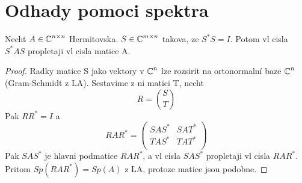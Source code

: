 \section{\texorpdfstring{Odhady pomoci spektra}{Odhady pomoci spektra}}
\vspace{5mm}
\large

\begin{theorem}[Propletani A]\label{sp_cross_a}
	Necht $A \in \operatorname{\mathbb{C}}^{n \times n}$ Hermitovska. $S \in \operatorname{\mathbb{C}}^{m \times n}$ takova, ze $S^{\ast}S = I$.
	Potom vl cisla $S^{\ast}AS$ propletaji vl cisla matice A.
\end{theorem}
\begin{proof}
	Radky matice S jako vektory v $\operatorname{\mathbb{C}}^n$ lze rozsirit na ortonormalní baze $\operatorname{\mathbb{C}}^n$ (Gram-Schmidt z LA). Sestavime z ni matici T, necht
	\[ R = \binom{S}{T} \]
	Pak $RR^{\ast} = I$ a
\[
	RAR^{\ast} =
	\begin{pmatrix}
		SAS^{\ast} & SAT^{\ast} \\
		TAS^{\ast} & TAT^{\ast} \\
	\end{pmatrix}
\]
	Pak $SAS^{\ast}$ je hlavni podmatice $RAR^{\ast}$, a vl cisla $SAS^{\ast}$ propletaji vl cisla $RAR^{\ast}$.
	Pritom $Sp(RAR^{\ast}) = Sp(A)$ z LA, protoze matice jsou podobne.
\end{proof}

